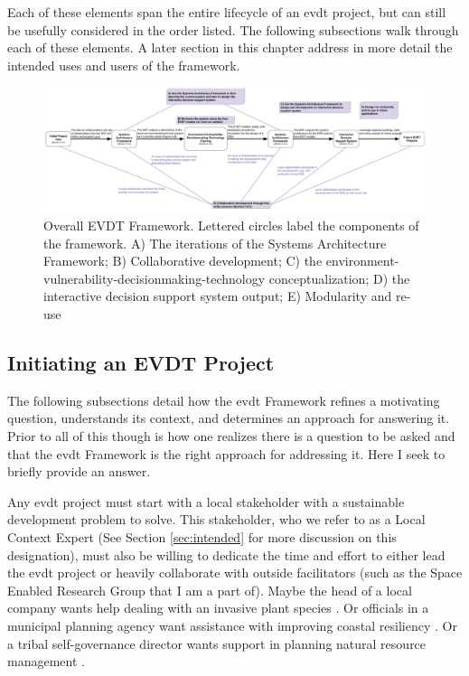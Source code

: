 Each of these elements span the entire lifecycle of an \ac{evdt} project, but can still be usefully considered in the order listed. The following subsections walk through each of these elements. A later section in this chapter address in more detail the intended uses and users of the framework.

\begin{landscape}
\begin{figure}[t]
	\centering
	\includegraphics[width=1\textwidth]{Figures/chap3/evdt_framework.png}
	\caption[Overall EVDT Framework]{Overall EVDT Framework. Lettered circles label the components of the framework. A) The iterations of the Systems Architecture Framework; B) Collaborative development; C) the environment-vulnerability-decisionmaking-technology conceptualization; D) the interactive decision support system output; E) Modularity and re-use}
	\label{fig:evdt_framework}
\end{figure}
\end{landscape}



\subsection{Initiating an EVDT Project} \label{sec:initiate}

The following subsections detail how the \ac{evdt} Framework refines a motivating question, understands its context, and determines an approach for answering it. Prior to all of this though is how one realizes there is a question to be asked and that the \ac{evdt} Framework is the right approach for addressing it. Here I seek to briefly provide an answer.

Any \ac{evdt} project must start with a local stakeholder with a sustainable development problem to solve. This stakeholder, who we refer to as a Local Context Expert (See Section \ref{sec:intended} for more discussion on this designation), must also be willing to dedicate the time and effort to either lead the \ac{evdt} project or heavily collaborate with outside facilitators (such as the Space Enabled Research Group that I am a part of). Maybe the head of a local company wants help dealing with an invasive plant species \cite{ovienmhadaInclusiveDesignEarth2021}. Or officials in a municipal planning agency want assistance with improving coastal resiliency \cite{lombardoEnvironmentVulnerabilityDecisionTechnologyFrameworkDecision2022}.   Or a tribal self-governance director wants support in planning natural resource management \cite{lombardoUtilizingSatelliteEarth2022}.

